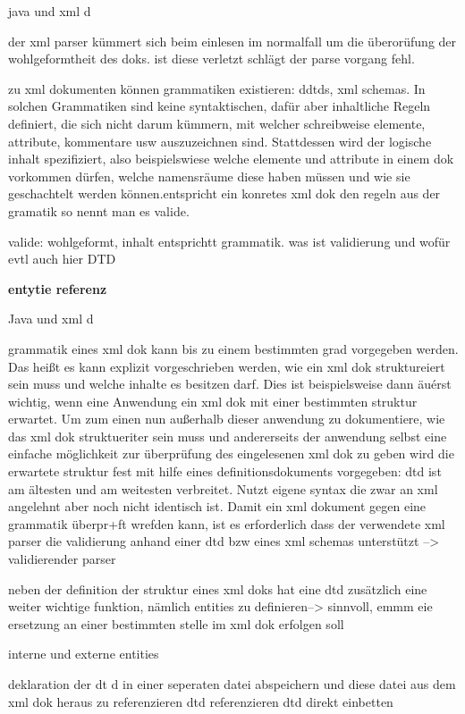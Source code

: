 java und xml d

der xml parser kümmert sich beim einlesen im normalfall um die überorüfung der wohlgeformtheit des doks. ist diese verletzt schlägt der parse vorgang fehl.

zu xml dokumenten können grammatiken existieren: ddtds, xml schemas. In solchen Grammatiken sind keine syntaktischen, dafür aber inhaltliche Regeln definiert, die sich nicht darum kümmern, mit welcher schreibweise elemente, attribute, kommentare usw auszuzeichnen sind. Stattdessen wird der logische inhalt spezifiziert, also beispielswiese welche elemente und attribute in einem dok vorkommen dürfen, welche namensräume diese haben müssen und wie sie geschachtelt werden können.entspricht ein konretes xml dok den regeln aus der gramatik so nennt man es valide. 

valide: wohlgeformt, inhalt entsprichtt grammatik.
was ist validierung und wofür evtl auch hier 
DTD

\textbf{entytie referenz}

Java und xml d

grammatik eines xml dok kann bis zu einem bestimmten grad vorgegeben werden. Das heißt es kann explizit vorgeschrieben werden, wie ein xml dok struktureiert sein muss und welche inhalte es besitzen darf. Dies ist beispielsweise dann äuérst wichtig, wenn eine Anwendung ein xml dok mit einer bestimmten struktur erwartet. Um zum einen nun außerhalb dieser anwendung zu dokumentiere, wie das xml dok struktueriter sein muss und andererseits der anwendung selbst eine einfache möglichkeit zur überprüfung des  eingelesenen xml dok zu geben wird die erwartete struktur fest mit hilfe eines definitionsdokuments vorgegeben: 
dtd ist am ältesten und am weitesten verbreitet. Nutzt eigene syntax die zwar an xml angelehnt aber noch nicht identisch ist. Damit ein xml dokument gegen eine grammatik überpr+ft wrefden kann, ist es erforderlich dass der verwendete xml parser die validierung anhand einer dtd bzw eines xml schemas unterstützt –> validierender parser

neben der definition der struktur eines xml doks hat eine dtd zusätzlich eine weiter wichtige funktion, nämlich entities zu definieren--> sinnvoll, emmm eie ersetzung an einer bestimmten stelle im xml dok erfolgen soll

interne und externe entities

deklaration der dt d in einer seperaten datei abspeichern und diese datei aus dem xml dok heraus zu referenzieren dtd referenzieren dtd direkt einbetten

